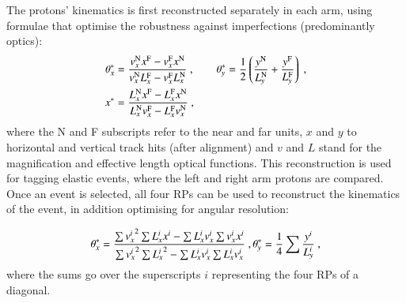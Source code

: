 The protons' kinematics is first reconstructed separately in each arm, using formulae that optimise the robustness against imperfections (predominantly optics):
\begin{equation}
\label{eq:kin 1a}
	\begin{aligned}
		\theta_x^* &= {v_x^{\rm N} x^{\rm F} - v_x^{\rm F} x^{\rm N}\over v_x^{\rm N} L_x^{\rm F} - v_x^{\rm F} L_x^{\rm N}}\ ,\qquad
		\theta_y^* = {1\over 2} \left( {y^{\rm N}\over L_y^{\rm N}} + {y^{\rm F}\over L_y^{\rm F}} \right)\ ,\\
		x^* &= {L_x^{\rm N} x^{\rm F} - L_x^{\rm F} x^{\rm N}\over L_x^{\rm N} v_x^{\rm F} - L_x^{\rm F} v_x^{\rm N}}\ , \\
	\end{aligned}
\end{equation}
where the N and F subscripts refer to the near and far units, $x$ and $y$ to horizontal and vertical track hits (after alignment) and $v$ and $L$ stand for the magnification and effective length optical functions. This reconstruction is used for tagging elastic events, where the left and right arm protons are compared. Once an event is selected, all four RPs can be used to reconstruct the kinematics of the event, in addition optimising for angular resolution:

\begin{equation}
\label{eq:kin 2a}
		\theta_x^* = {
				\sum {v_x^i}^2 \sum L_x^i x^i - \sum L_x^i v_x^i \sum v_x^i x^i
				\over
				\sum {v_x^i}^2 \sum {L_x^i}^2 - \sum L_x^i v_x^i \sum L_x^i v_x^i
			}\ ,
		\theta_y^* = {1\over 4} \sum {y^i\over L_y^i}\ ,
\end{equation}
where the sums go over the superscripts $i$ representing the four RPs of a diagonal.

